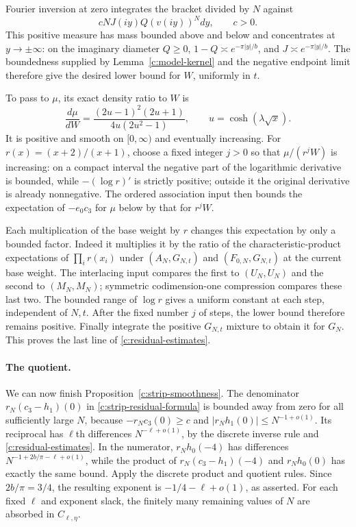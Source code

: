 Fourier inversion at zero integrates the bracket divided by $N$ against
\[
 cNJ(iy)Q(v(iy))^Ndy,\qquad c>0.
\]
This positive measure has mass bounded above and below and concentrates
at $y\to\pm\infty$: on the imaginary diameter $Q\ge0$,
$1-Q\asymp e^{-\pi|y|/b}$, and
$J\asymp e^{-\pi|y|/b}$.
The boundedness supplied by Lemma~\ref{c:model-kernel} and the negative
endpoint limit therefore give the desired lower bound for $W$,
uniformly in $t$.

To pass to $\mu$, its exact density ratio to $W$ is
\[
 \frac{d\mu}{dW}
 =\frac{(2u-1)^2(2u+1)}{4u(2u^2-1)},
 \qquad u=\cosh(\lambda\sqrt x).
\]
It is positive and smooth on $[0,\infty)$ and eventually increasing.
For $r(x)=(x+2)/(x+1)$, choose a fixed integer $j>0$ so that
$\mu/(r^jW)$ is increasing: on a compact interval the negative part
of the logarithmic derivative is bounded, while
$-(\log r)'$ is strictly positive; outside it the original derivative
is already nonnegative.  The ordered association input then bounds
the expectation of $-e_0c_3$ for $\mu$ below by that for $r^jW$.

Each multiplication of the base weight by $r$ changes this expectation
by only a bounded factor.  Indeed it multiplies it by the ratio of the
characteristic-product expectations of $\prod_i r(x_i)$ under
$(A_N,G_{N,t})$ and $(F_{0,N},G_{N,t})$ at the current base weight.
The interlacing input compares the first to $(U_N,U_N)$ and the second
to $(M_N,M_N)$; symmetric codimension-one compression compares these
last two.  The bounded range of $\log r$ gives a uniform constant at
each step, independent of $N,t$.  After the fixed number $j$ of steps,
the lower bound therefore remains positive.  Finally integrate the
positive $G_{N,t}$ mixture to obtain it for $G_N$.
This proves the last line of \eqref{c:residual-estimates}.

\paragraph{The quotient.}
We can now finish Proposition~\ref{c:strip-smoothness}.
The denominator $r_N(c_3-h_1)(0)$ in
\eqref{c:strip-residual-formula} is bounded away from zero for all
sufficiently large $N$, because
$-r_Nc_3(0)\ge c$ and $|r_Nh_1(0)|\le N^{-1+o(1)}$.
Its reciprocal has $\ell$th differences $N^{-\ell+o(1)}$, by the
discrete inverse rule and \eqref{c:residual-estimates}.  In the
numerator, $r_Nh_0(-4)$ has differences
$N^{-1+2b/\pi-\ell+o(1)}$, while the product of
$r_N(c_3-h_1)(-4)$ and $r_Nh_0(0)$ has exactly the same bound.
Apply the discrete product and quotient rules.  Since
$2b/\pi=3/4$, the resulting exponent is $-1/4-\ell+o(1)$,
as asserted.  For each fixed $\ell$ and exponent slack, the finitely
many remaining values of $N$ are absorbed in $C_{\ell,\eta}$.
